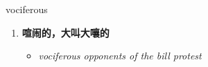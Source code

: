 
\begin{frame}
{\huge vociferous}
\begin{center}
\begin{enumerate}\Large
  \item \textbf{喧闹的，大叫大嚷的}
  \begin{itemize}
    \item \em{\Large{vociferous opponents of the bill protest}}
  \end{itemize}
\end{enumerate}
\end{center}
\end{frame}
